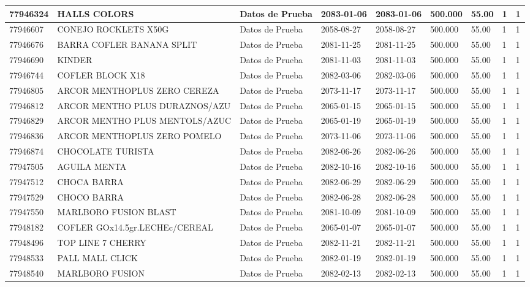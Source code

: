 \documentclass[a4paper,12pt]{article}
\begin{document}
\begin{landscape}
\begin{longtable}{|p{4cm}|p{2.5cm}|p{2.5cm}|p{1.8cm}|p{1.8cm}|p{1cm}|p{1cm}|p{3cm}|p{3cm}||}
77946324 & HALLS COLORS & Datos de Prueba & 2083-01-06 & 2083-01-06 & 500.000 & 55.00 & 1 & 1 \\ \hline 
77946607 & CONEJO ROCKLETS X50G & Datos de Prueba & 2058-08-27 & 2058-08-27 & 500.000 & 55.00 & 1 & 1 \\ \hline 
77946676 & BARRA COFLER BANANA SPLIT & Datos de Prueba & 2081-11-25 & 2081-11-25 & 500.000 & 55.00 & 1 & 1 \\ \hline 
77946690 & KINDER & Datos de Prueba & 2081-11-03 & 2081-11-03 & 500.000 & 55.00 & 1 & 1 \\ \hline 
77946744 & COFLER BLOCK X18 & Datos de Prueba & 2082-03-06 & 2082-03-06 & 500.000 & 55.00 & 1 & 1 \\ \hline 
77946805 & ARCOR MENTHOPLUS ZERO CEREZA & Datos de Prueba & 2073-11-17 & 2073-11-17 & 500.000 & 55.00 & 1 & 1 \\ \hline 
77946812 & ARCOR MENTHO PLUS DURAZNOS/AZU & Datos de Prueba & 2065-01-15 & 2065-01-15 & 500.000 & 55.00 & 1 & 1 \\ \hline 
77946829 & ARCOR MENTHO PLUS MENTOLS/AZUC & Datos de Prueba & 2065-01-19 & 2065-01-19 & 500.000 & 55.00 & 1 & 1 \\ \hline 
77946836 & ARCOR MENTHOPLUS ZERO POMELO & Datos de Prueba & 2073-11-06 & 2073-11-06 & 500.000 & 55.00 & 1 & 1 \\ \hline 
77946874 & CHOCOLATE TURISTA & Datos de Prueba & 2082-06-26 & 2082-06-26 & 500.000 & 55.00 & 1 & 1 \\ \hline 
77947505 & AGUILA MENTA & Datos de Prueba & 2082-10-16 & 2082-10-16 & 500.000 & 55.00 & 1 & 1 \\ \hline 
77947512 & CHOCA BARRA & Datos de Prueba & 2082-06-29 & 2082-06-29 & 500.000 & 55.00 & 1 & 1 \\ \hline 
77947529 & CHOCO BARRA & Datos de Prueba & 2082-06-28 & 2082-06-28 & 500.000 & 55.00 & 1 & 1 \\ \hline 
77947550 & MARLBORO FUSION BLAST & Datos de Prueba & 2081-10-09 & 2081-10-09 & 500.000 & 55.00 & 1 & 1 \\ \hline 
77948182 & COFLER GOx14.5gr.LECHEc/CEREAL & Datos de Prueba & 2065-01-07 & 2065-01-07 & 500.000 & 55.00 & 1 & 1 \\ \hline 
77948496 & TOP LINE 7 CHERRY & Datos de Prueba & 2082-11-21 & 2082-11-21 & 500.000 & 55.00 & 1 & 1 \\ \hline 
77948533 & PALL MALL CLICK & Datos de Prueba & 2082-01-19 & 2082-01-19 & 500.000 & 55.00 & 1 & 1 \\ \hline 
77948540 & MARLBORO FUSION & Datos de Prueba & 2082-02-13 & 2082-02-13 & 500.000 & 55.00 & 1 & 1 \\ \hline 

\end{longtable}
\end{landscape}
\end{document}
